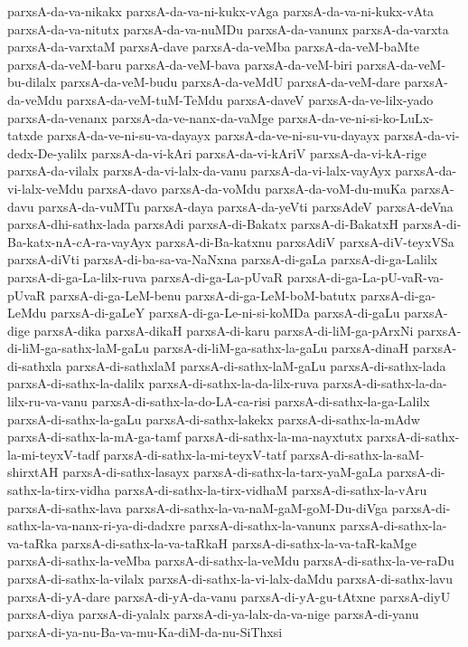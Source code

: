 {parxsA-da-va-nikakx
parxsA-da-va-ni-kukx-vAga
parxsA-da-va-ni-kukx-vAta
parxsA-da-va-nitutx
parxsA-da-va-nuMDu
parxsA-da-vanunx
parxsA-da-varxta
parxsA-da-varxtaM
parxsA-dave
parxsA-da-veMba
parxsA-da-veM-baMte
parxsA-da-veM-baru
parxsA-da-veM-bava
parxsA-da-veM-biri
parxsA-da-veM-bu-dilalx
parxsA-da-veM-budu
parxsA-da-veMdU
parxsA-da-veM-dare
parxsA-da-veMdu
parxsA-da-veM-tuM-TeMdu
parxsA-daveV
parxsA-da-ve-lilx-yado
parxsA-da-venanx
parxsA-da-ve-nanx-da-vaMge
parxsA-da-ve-ni-si-ko-LuLx-tatxde
parxsA-da-ve-ni-su-va-dayayx
parxsA-da-ve-ni-su-vu-dayayx
parxsA-da-vi-dedx-De-yalilx
parxsA-da-vi-kAri
parxsA-da-vi-kAriV
parxsA-da-vi-kA-rige
parxsA-da-vilalx
parxsA-da-vi-lalx-da-vanu
parxsA-da-vi-lalx-vayAyx
parxsA-da-vi-lalx-veMdu
parxsA-davo
parxsA-da-voMdu
parxsA-da-voM-du-muKa
parxsA-davu
parxsA-da-vuMTu
parxsA-daya
parxsA-da-yeVti
parxsAdeV
parxsA-deVna
parxsA-dhi-sathx-lada
parxsAdi
parxsA-di-Bakatx
parxsA-di-BakatxH
parxsA-di-Ba-katx-nA-cA-ra-vayAyx
parxsA-di-Ba-katxnu
parxsAdiV
parxsA-diV-teyxVSa
parxsA-diVti
parxsA-di-ba-sa-va-NaNxna
parxsA-di-gaLa
parxsA-di-ga-Lalilx
parxsA-di-ga-La-lilx-ruva
parxsA-di-ga-La-pUvaR
parxsA-di-ga-La-pU-vaR-va-pUvaR
parxsA-di-ga-LeM-benu
parxsA-di-ga-LeM-boM-batutx
parxsA-di-ga-LeMdu
parxsA-di-gaLeY
parxsA-di-ga-Le-ni-si-koMDa
parxsA-di-gaLu
parxsA-dige
parxsA-dika
parxsA-dikaH
parxsA-di-karu
parxsA-di-liM-ga-pArxNi
parxsA-di-liM-ga-sathx-laM-gaLu
parxsA-di-liM-ga-sathx-la-gaLu
parxsA-dinaH
parxsA-di-sathxla
parxsA-di-sathxlaM
parxsA-di-sathx-laM-gaLu
parxsA-di-sathx-lada
parxsA-di-sathx-la-dalilx
parxsA-di-sathx-la-da-lilx-ruva
parxsA-di-sathx-la-da-lilx-ru-va-vanu
parxsA-di-sathx-la-do-LA-ca-risi
parxsA-di-sathx-la-ga-Lalilx
parxsA-di-sathx-la-gaLu
parxsA-di-sathx-lakekx
parxsA-di-sathx-la-mAdw
parxsA-di-sathx-la-mA-ga-tamf
parxsA-di-sathx-la-ma-nayxtutx
parxsA-di-sathx-la-mi-teyxV-tadf
parxsA-di-sathx-la-mi-teyxV-tatf
parxsA-di-sathx-la-saM-shirxtAH
parxsA-di-sathx-lasayx
parxsA-di-sathx-la-tarx-yaM-gaLa
parxsA-di-sathx-la-tirx-vidha
parxsA-di-sathx-la-tirx-vidhaM
parxsA-di-sathx-la-vAru
parxsA-di-sathx-lava
parxsA-di-sathx-la-va-naM-gaM-goM-Du-diVga
parxsA-di-sathx-la-va-nanx-ri-ya-di-dadxre
parxsA-di-sathx-la-vanunx
parxsA-di-sathx-la-va-taRka
parxsA-di-sathx-la-va-taRkaH
parxsA-di-sathx-la-va-taR-kaMge
parxsA-di-sathx-la-veMba
parxsA-di-sathx-la-veMdu
parxsA-di-sathx-la-ve-raDu
parxsA-di-sathx-la-vilalx
parxsA-di-sathx-la-vi-lalx-daMdu
parxsA-di-sathx-lavu
parxsA-di-yA-dare
parxsA-di-yA-da-vanu
parxsA-di-yA-gu-tAtxne
parxsA-diyU
parxsA-diya
parxsA-di-yalalx
parxsA-di-ya-lalx-da-va-nige
parxsA-di-yanu
parxsA-di-ya-nu-Ba-va-mu-Ka-diM-da-nu-SiThxsi
}
